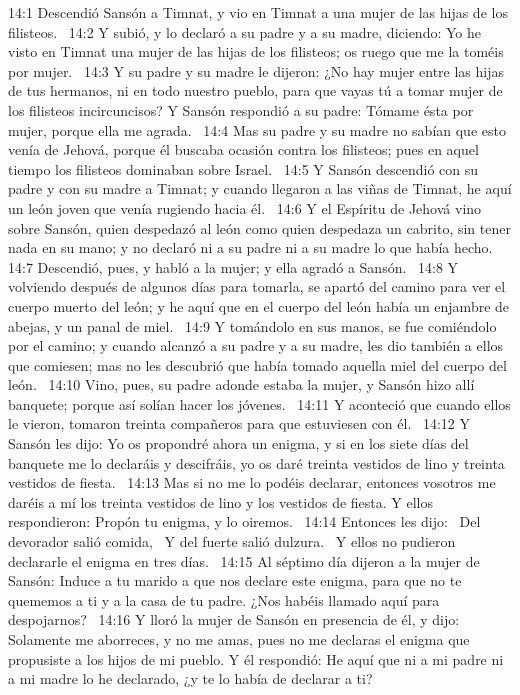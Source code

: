 14:1 Descendió Sansón a Timnat, y vio en Timnat a una mujer de las hijas de los filisteos.  
14:2 Y subió, y lo declaró a su padre y a su madre, diciendo: Yo he visto en Timnat una mujer de las hijas de los filisteos; os ruego que me la toméis por mujer.  
14:3 Y su padre y su madre le dijeron: ¿No hay mujer entre las hijas de tus hermanos, ni en todo nuestro pueblo, para que vayas tú a tomar mujer de los filisteos incircuncisos? Y Sansón respondió a su padre: Tómame ésta por mujer, porque ella me agrada.  
14:4 Mas su padre y su madre no sabían que esto venía de Jehová, porque él buscaba ocasión contra los filisteos; pues en aquel tiempo los filisteos dominaban sobre Israel.  
14:5 Y Sansón descendió con su padre y con su madre a Timnat; y cuando llegaron a las viñas de Timnat, he aquí un león joven que venía rugiendo hacia él.  
14:6 Y el Espíritu de Jehová vino sobre Sansón, quien despedazó al león como quien despedaza un cabrito, sin tener nada en su mano; y no declaró ni a su padre ni a su madre lo que había hecho.  
14:7 Descendió, pues, y habló a la mujer; y ella agradó a Sansón.  
14:8 Y volviendo después de algunos días para tomarla, se apartó del camino para ver el cuerpo muerto del león; y he aquí que en el cuerpo del león había un enjambre de abejas, y un panal de miel.  
14:9 Y tomándolo en sus manos, se fue comiéndolo por el camino; y cuando alcanzó a su padre y a su madre, les dio también a ellos que comiesen; mas no les descubrió que había tomado aquella miel del cuerpo del león.  
14:10 Vino, pues, su padre adonde estaba la mujer, y Sansón hizo allí banquete; porque así solían hacer los jóvenes.  
14:11 Y aconteció que cuando ellos le vieron, tomaron treinta compañeros para que estuviesen con él.  
14:12 Y Sansón les dijo: Yo os propondré ahora un enigma, y si en los siete días del banquete me lo declaráis y descifráis, yo os daré treinta vestidos de lino y treinta vestidos de fiesta.  
14:13 Mas si no me lo podéis declarar, entonces vosotros me daréis a mí los treinta vestidos de lino y los vestidos de fiesta. Y ellos respondieron: Propón tu enigma, y lo oiremos.  
14:14 Entonces les dijo:  
Del devorador salió comida,  
Y del fuerte salió dulzura.  
Y ellos no pudieron declararle el enigma en tres días.  
14:15 Al séptimo día dijeron a la mujer de Sansón: Induce a tu marido a que nos declare este enigma, para que no te quememos a ti y a la casa de tu padre. ¿Nos habéis llamado aquí para despojarnos?  
14:16 Y lloró la mujer de Sansón en presencia de él, y dijo: Solamente me aborreces, y no me amas, pues no me declaras el enigma que propusiste a los hijos de mi pueblo. Y él respondió: He aquí que ni a mi padre ni a mi madre lo he declarado, ¿y te lo había de declarar a ti?  

